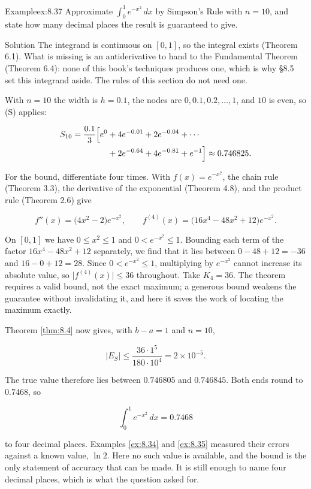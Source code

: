 \documentclass[a4paper,12pt,oneside]{memoir}
\begin{document}
\begin{workedexample}
\begin{envexample}{Example}{ex:8.37}{}
Approximate \(\displaystyle\int_{0}^{1} e^{-x^{2}}\,dx\) by Simpson’s Rule with \(n = 10\), and state how many decimal places the result is guaranteed to give.
\end{envexample}
\begin{envsolution}{Solution}{}{}
The integrand is continuous on \([0, 1]\), so the integral exists (Theorem 6.1). What is missing is an antiderivative to hand to the Fundamental Theorem (Theorem 6.4): none of this book’s techniques produces one, which is why §8.5 set this integrand aside. The rules of this section do not need one.

With \(n = 10\) the width is \(h = 0.1\), the nodes are \(0, 0.1, 0.2, \dots, 1\), and \(10\) is even, so (S) applies:

\[ \begin{aligned}
          S_{10} = \frac{0.1}{3}\Bigl[e^{0} &+ 4e^{-0.01} + 2e^{-0.04} + \cdots \\
            &+ 2e^{-0.64} + 4e^{-0.81} + e^{-1}\Bigr] \approx 0.746825.
        \end{aligned} \]

For the bound, differentiate four times. With \(f(x) = e^{-x^{2}}\), the chain rule (Theorem 3.3), the derivative of the exponential (Theorem 4.8), and the product rule (Theorem 2.6) give

\[ f''(x) = \bigl(4x^{2} - 2\bigr)e^{-x^{2}}, \qquad f^{(4)}(x) = \bigl(16x^{4} - 48x^{2} + 12\bigr)e^{-x^{2}}. \]

On \([0, 1]\) we have \(0 \le x^{2} \le 1\) and \(0 < e^{-x^{2}} \le 1\). Bounding each term of the factor \(16x^{4} - 48x^{2} + 12\) separately, we find that it lies between \(0 - 48 + 12 = -36\) and \(16 - 0 + 12 = 28\). Since \(0 < e^{-x^{2}} \le 1\), multiplying by \(e^{-x^{2}}\) cannot increase its absolute value, so \(\lvert f^{(4)}(x)\rvert \le 36\) throughout. Take \(K_{4} = 36\). The theorem requires a valid bound, not the exact maximum; a generous bound weakens the guarantee without invalidating it, and here it saves the work of locating the maximum exactly.

Theorem \ref{thm:8.4} now gives, with \(b - a = 1\) and \(n = 10\),

\[ \lvert E_{S}\rvert \le \frac{36 \cdot 1^{5}}{180 \cdot 10^{4}} = 2 \times 10^{-5}. \]

The true value therefore lies between \(0.746805\) and \(0.746845\). Both ends round to \(0.7468\), so

\[ \int_{0}^{1} e^{-x^{2}}\,dx = 0.7468 \]

to four decimal places. Examples \ref{ex:8.34} and \ref{ex:8.35} measured their errors against a known value, \(\ln 2\). Here no such value is available, and the bound is the only statement of accuracy that can be made. It is still enough to name four decimal places, which is what the question asked for. \qedmark
\end{envsolution}
\end{workedexample}
\end{document}
